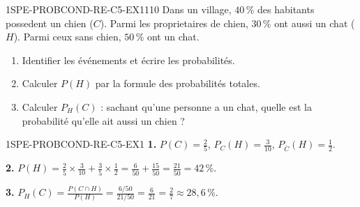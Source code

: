 

\begin{exercice}{1SPE-PROBCOND-RE-C5-EX1}{1}{10}
Dans un village, $40\,\%$ des habitants possedent un chien ($C$). Parmi les proprietaires de chien, $30\,\%$ ont aussi un chat ($H$). Parmi ceux sans chien, $50\,\%$ ont un chat.

\begin{enumerate}
  \item Identifier les événements et écrire les probabilités.
  \item Calculer $P(H)$ par la formule des probabilités totales.
  \item Calculer $P_H(C)$ : sachant qu'une personne a un chat, quelle est la probabilité qu'elle ait aussi un chien ?
\end{enumerate}
\end{exercice}


\begin{corrige}{1SPE-PROBCOND-RE-C5-EX1}
\textbf{1.} $P(C) = \frac{2}{5}$, $P_C(H) = \frac{3}{10}$, $P_{\overline{C}}(H) = \frac{1}{2}$.

\textbf{2.} $P(H) = \frac{2}{5}\times\frac{3}{10} + \frac{3}{5}\times\frac{1}{2} = \frac{6}{50}+\frac{15}{50} = \frac{21}{50} = 42\,\%$.

\textbf{3.} $P_H(C) = \frac{P(C \cap H)}{P(H)} = \frac{6/50}{21/50} = \frac{6}{21} = \frac{2}{7} \approx 28{,}6\,\%$.
\end{corrige}
